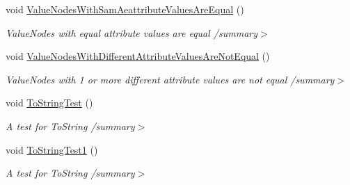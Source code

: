 \begin{DoxyCompactItemize}
\item 
void \hyperlink{class__1920_parser_test_1_1_value_node_test_a3241f6e4d162f00c3a4dccb1290efffc}{Value\+Nodes\+With\+Sam\+Aeattribute\+Values\+Are\+Equal} ()\hypertarget{class__1920_parser_test_1_1_value_node_test_a3241f6e4d162f00c3a4dccb1290efffc}{}\label{class__1920_parser_test_1_1_value_node_test_a3241f6e4d162f00c3a4dccb1290efffc}

\begin{DoxyCompactList}\small\item\em Value\+Nodes with equal attribute values are equal /summary$>$ \end{DoxyCompactList}\item 
void \hyperlink{class__1920_parser_test_1_1_value_node_test_af7c5889f21a4113c8103c3acdfef291b}{Value\+Nodes\+With\+Different\+Attribute\+Values\+Are\+Not\+Equal} ()\hypertarget{class__1920_parser_test_1_1_value_node_test_af7c5889f21a4113c8103c3acdfef291b}{}\label{class__1920_parser_test_1_1_value_node_test_af7c5889f21a4113c8103c3acdfef291b}

\begin{DoxyCompactList}\small\item\em Value\+Nodes with 1 or more different attribute values are not equal /summary$>$ \end{DoxyCompactList}\item 
void \hyperlink{class__1920_parser_test_1_1_value_node_test_a0c4864257368d8dff33254966a7a98ef}{To\+String\+Test} ()\hypertarget{class__1920_parser_test_1_1_value_node_test_a0c4864257368d8dff33254966a7a98ef}{}\label{class__1920_parser_test_1_1_value_node_test_a0c4864257368d8dff33254966a7a98ef}

\begin{DoxyCompactList}\small\item\em A test for To\+String /summary$>$ \end{DoxyCompactList}\item 
void \hyperlink{class__1920_parser_test_1_1_value_node_test_a99c88a4e50cdb9851954619658fe6211}{To\+String\+Test1} ()\hypertarget{class__1920_parser_test_1_1_value_node_test_a99c88a4e50cdb9851954619658fe6211}{}\label{class__1920_parser_test_1_1_value_node_test_a99c88a4e50cdb9851954619658fe6211}

\begin{DoxyCompactList}\small\item\em A test for To\+String /summary$>$ \end{DoxyCompactList}\end{DoxyCompactItemize}


